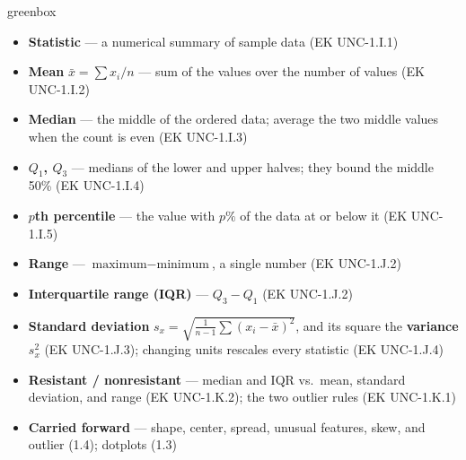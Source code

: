\documentclass[10pt]{article}
\begin{document}
\boxguard
\begin{skillbox}{greenbox}
\begin{minipage}[t]{0.48\linewidth}
    \begin{itemize}
        \item \textbf{Statistic} --- a numerical summary of sample data (EK UNC-1.I.1)
        \item \textbf{Mean} $\bar x = \sum x_i / n$ --- sum of the values over the number of
              values (EK UNC-1.I.2)
        \item \textbf{Median} --- the middle of the ordered data; average the two middle values
              when the count is even (EK UNC-1.I.3)
        \item \textbf{$Q_1$, $Q_3$} --- medians of the lower and upper halves; they bound the
              middle 50\% (EK UNC-1.I.4)
        \item \textbf{$p$th percentile} --- the value with $p\%$ of the data at or below it
              (EK UNC-1.I.5)
    \end{itemize}
\end{minipage}
\hfill
\begin{minipage}[t]{0.48\linewidth}
    \begin{itemize}
        \item \textbf{Range} --- $\text{maximum} - \text{minimum}$, a single number
              (EK UNC-1.J.2)
        \item \textbf{Interquartile range (IQR)} --- $Q_3 - Q_1$ (EK UNC-1.J.2)
        \item \textbf{Standard deviation} $s_x = \sqrt{\frac{1}{n-1}\sum (x_i - \bar x)^2}$,
              and its square the \textbf{variance} $s_x^2$ (EK UNC-1.J.3); changing units
              rescales every statistic (EK UNC-1.J.4)
        \item \textbf{Resistant / nonresistant} --- median and IQR vs.\ mean, standard
              deviation, and range (EK UNC-1.K.2); the two outlier rules (EK UNC-1.K.1)
        \item \textbf{Carried forward} --- shape, center, spread, unusual features, skew, and
              outlier (1.4); dotplots (1.3)
    \end{itemize}
\end{minipage}
\end{skillbox}
\end{document}
